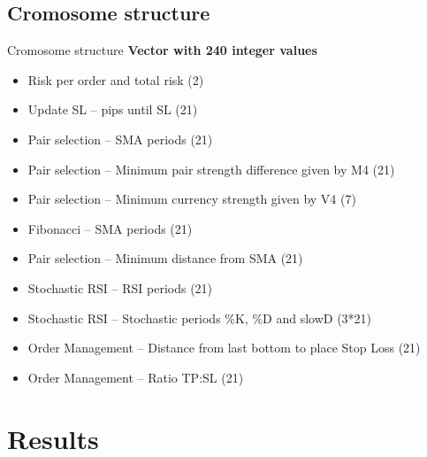 \documentclass[12pt,portuguese]{beamer}
\begin{document}
\subsection{Cromosome structure}
\begin{frame}{Cromosome structure}
	\textbf{Vector with 240 integer values}
	\footnotesize
	\begin{itemize}
		\item Risk per order and total risk (2)
		\item Update SL -- pips until SL (21)
		\item Pair selection -- SMA periods (21)
		\item Pair selection -- Minimum pair strength difference given by M4 (21)
		\item Pair selection -- Minimum currency strength given by V4 (7)
		\item Fibonacci -- SMA periods (21)
		\item Pair selection -- Minimum distance from SMA (21)
		\item Stochastic RSI -- RSI periods (21)
		\item Stochastic RSI -- Stochastic periods \%K, \%D and slowD (3*21)
		\item Order Management -- Distance from last bottom to place Stop Loss (21)
		\item Order Management -- Ratio TP:SL (21)
	\end{itemize}
\end{frame}

\section{Results}

\end{document}

